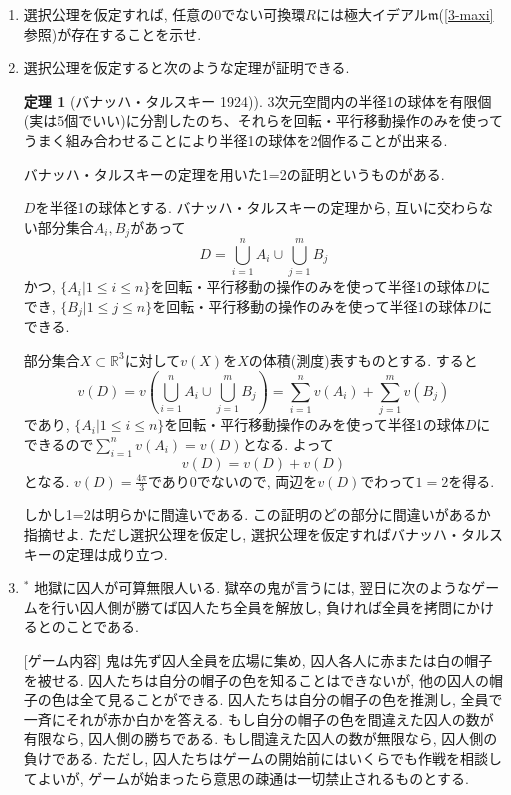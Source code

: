 \documentclass[dvipdfmx,a4paper,11pt]{article}
\newcommand{\R}{\mathbb{R}}
\theoremstyle{definition}
\newtheorem{thm}{定理}
\begin{document}
\begin{enumerate}[label=\textbf{問}\ref*{sec-9}.\arabic*]
  \item 選択公理を仮定すれば, 任意の0でない可換環$R$には極大イデアル$\mathfrak{m}$(\ref{3-maxi}参照)が存在することを示せ.

 
 \item 選択公理を仮定すると次のような定理が証明できる.
\begin{tcolorbox}[
    colback = white,
    colframe = black!35!black,
    fonttitle = \bfseries,
    breakable = true]
    \begin{thm}[バナッハ・タルスキー 1924)]
3次元空間内の半径1の球体を有限個(実は5個でいい)に分割したのち、それらを回転・平行移動操作のみを使ってうまく組み合わせることにより半径1の球体を2個作ることが出来る.
\end{thm}
 \end{tcolorbox}
バナッハ・タルスキーの定理を用いた1=2の証明というものがある.
\begin{tcolorbox}[
    colback = white,
    colframe = black!35!black,
    fonttitle = \bfseries,
    breakable = true]
[証明?] $D$を半径1の球体とする. 
バナッハ・タルスキーの定理から, 互いに交わらない部分集合$A_i, B_j$があって
$$
D = \bigcup_{i=1}^{n} A_i \cup \bigcup_{j=1}^{m} B_j
$$
かつ, $\{A_i | 1 \le i \le n \}$を回転・平行移動の操作のみを使って半径1の球体$D$にでき, $\{B_j | 1 \le j \le n \}$を回転・平行移動の操作のみを使って半径1の球体$D$にできる.

部分集合$X \subset \R^3$に対して$v(X)$を$X$の体積(測度)表すものとする.
すると
$$
v(D) = v\left(\bigcup_{i=1}^{n} A_i \cup \bigcup_{j=1}^{m} B_j\right)
=\sum_{i=1}^{n}v(A_i) + \sum_{j=1}^{m}v(B_j) 
$$
であり, $\{A_i | 1 \le i \le n \}$を回転・平行移動操作のみを使って半径1の球体$D$にできるので$\sum_{i=1}^{n}v(A_i)=v(D)$となる.
よって
$$
v(D) =v(D) + v(D)
$$
となる. 
$v(D)=\frac{4\pi}{3}$であり0でないので, 両辺を$v(D)$でわって$1=2$を得る. 
 \end{tcolorbox}
しかし1=2は明らかに間違いである. 
この証明のどの部分に間違いがあるか指摘せよ. ただし選択公理を仮定し, 選択公理を仮定すればバナッハ・タルスキーの定理は成り立つ. 
 
 \item $^{*}$ 地獄に囚人が可算無限人いる. 獄卒の鬼が言うには, 翌日に次のようなゲームを行い囚人側が勝てば囚人たち全員を解放し, 負ければ全員を拷問にかけるとのことである. 

[ゲーム内容]
鬼は先ず囚人全員を広場に集め, 囚人各人に赤または白の帽子を被せる. 囚人たちは自分の帽子の色を知ることはできないが, 他の囚人の帽子の色は全て見ることができる. 囚人たちは自分の帽子の色を推測し, 全員で一斉にそれが赤か白かを答える. もし自分の帽子の色を間違えた囚人の数が有限なら, 囚人側の勝ちである. もし間違えた囚人の数が無限なら, 囚人側の負けである. 
ただし, 囚人たちはゲームの開始前にはいくらでも作戦を相談してよいが, ゲームが始まったら意思の疎通は一切禁止されるものとする.


\end{enumerate}
\end{document}
